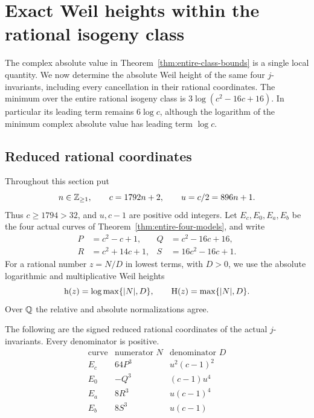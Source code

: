 \section{Exact Weil heights within the rational isogeny class}
\label{sec:uniform-weil-height}

The complex absolute value in
Theorem~\ref{thm:entire-class-bounds} is a single local quantity.
We now determine the absolute Weil height of the same four
$j$-invariants, including every cancellation in their rational
coordinates. The minimum over the entire rational isogeny class is
$3\log(c^2-16c+16)$. In particular its leading term remains
$6\log c$, although the logarithm of the minimum complex absolute
value has leading term $\log c$.

\subsection{Reduced rational coordinates}

Throughout this section put
\begin{equation}\label{eq:wh-parameters}
 n\in\mathbb Z_{\ge1},\qquad c=1792n+2,\qquad u=c/2=896n+1.
\end{equation}
Thus $c\ge1794>32$, and $u,c-1$ are positive odd integers.
Let $E_c,E_0,E_a,E_b$ be the four actual curves of
Theorem~\ref{thm:entire-four-models}, and write
\begin{equation}\label{eq:wh-polynomials}
 \begin{aligned}
 P&=c^2-c+1,& Q&=c^2-16c+16,\\
 R&=c^2+14c+1,& S&=16c^2-16c+1.
 \end{aligned}
\end{equation}
For a rational number $z=N/D$ in lowest terms, with $D>0$, we use
the absolute logarithmic and multiplicative Weil heights
\begin{equation}\label{eq:wh-rational-height}
 \mathrm h(z)=\log\max\{|N|,D\},\qquad
 \mathrm H(z)=\max\{|N|,D\}.
\end{equation}
Over $\mathbb Q$ the relative and absolute normalizations agree.

\begin{proposition}\label{prop:wh-reduced-fractions}
The following are the signed reduced rational coordinates of the
actual $j$-invariants. Every denominator is positive.
\[
\begin{array}{c|r|l}
 \text{curve}&\text{numerator }N&\text{denominator }D\\ \hline
 E_c&64P^3&u^2(c-1)^2\\
 E_0&-Q^3&(c-1)u^4\\
 E_a&8R^3&u(c-1)^4\\
 E_b&8S^3&u(c-1)
\end{array}
\]
\end{proposition}

